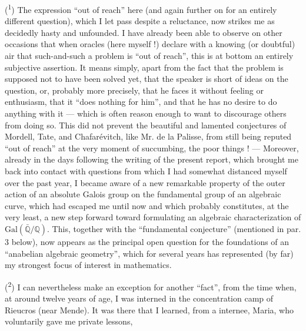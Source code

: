
(\textsuperscript{1}) The expression ``out of reach'' here (and again further on for
an entirely different question), which I let pass despite
a reluctance, now strikes me as decidedly hasty and
unfounded. I have already been able to observe on other occasions that when
oracles (here myself !) declare with a knowing
(or doubtful) air that such-and-such a problem is ``out of reach'', this is
at bottom an entirely subjective assertion. It means
simply, apart from the fact that the problem is supposed not to have been
solved yet, that the speaker is short of ideas on the
question, or, probably more precisely, that he faces
it without feeling or enthusiasm, that it ``does nothing for him'', and
that he has no desire to do anything with it --- which
is often reason enough to want to discourage others
from doing so. This did not prevent the beautiful and lamented conjectures
of Mordell, Tate, and Chafarévitch, like Mr. de la Palisse,
from still being reputed ``out of reach'' at the very moment
of succumbing, the poor things ! --- Moreover, already in the days
following the writing of the present report, which brought me back
into contact with questions from which I had somewhat distanced myself
over the past year, I became aware of a new remarkable
property of the outer action of an absolute Galois
group on the fundamental group of an algebraic curve, which had
escaped me until now and which probably constitutes, at the very least,
a new step forward toward formulating an algebraic
characterization of $\mathrm{Gal}(\bar{\mathbb{Q}}/\mathbb{Q})$. This, together with the ``fundamental
conjecture'' (mentioned in par. 3 below), now appears as
the principal open question for the foundations of an ``anabelian
algebraic geometry'', which for several years has represented
(by far) my strongest focus of interest in mathematics.

(\textsuperscript{2}) I can nevertheless make an exception for another ``fact'', from the time
when, at around twelve years of age, I was interned in the concentration
camp of Rieucros (near Mende). It was there that I learned, from a
internee, Maria, who voluntarily gave me private lessons,

